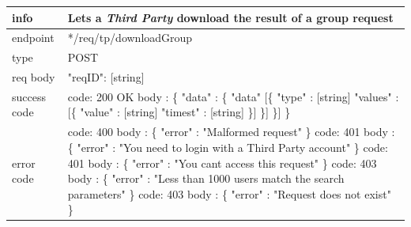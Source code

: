 \documentclass[titlepage]{article}
\begin{document}
	\begin{tabularx}{\textwidth}{lX} \hline
		info & Lets a {\it Third Party} download the result of a group request \\ \hline
		endpoint & */req/tp/downloadGroup \\ \hline
		type & POST \\ \hline
		req body &
		"reqID": [string] \\ \hline
		success code &
		code: 200 OK \newline  
		body : \{ \newline
		"data" : \{ \newline
		[\{\newline
		"userid" : [string]
		"data" [\{\newline
		"type" : [string] \newline
		"values" : [\{ \newline
		"value" : [string] \newline
		"timest" : [string] \newline
		\}] \newline
		\}] \newline
		\}] \newline
		\} \\ \hline
		error code &
		code: 400 \newline
		body : \{ "error" : "Malformed request" \} \newline \newline
		code: 401 \newline
		body : \{ "error" : "You need to login with a Third Party account" \} \newline \newline 
		code: 401 \newline
		body : \{ "error" : "You can\textsc{\char13}t access this request" \} \newline \newline 
		code: 403 \newline
		body : \{ "error" : "Less than 1000 users match the search parameters" \} \newline \newline 
		code: 403 \newline
		body : \{ "error" : "Request does not exist" \} \\ \hline
	\end{tabularx}
	
	\vspace{\baselineskip}
	
\end{document}
